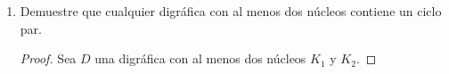 \documentclass{article}
\begin{document}
\begin{enumerate}
  \item Demuestre que cualquier digr\'afica con al menos dos n\'ucleos
    contiene un ciclo par.

    \begin{proof}
      Sea $D$ una digráfica con al menos dos núcleos $K_1$ y $K_2$.
    \end{proof}
    
  \end{enumerate}
\end{document}

